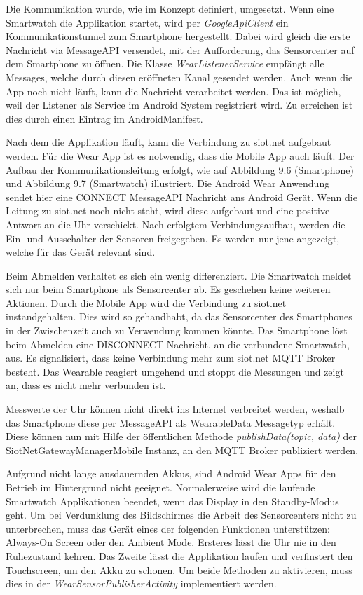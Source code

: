 Die Kommunikation wurde, wie im Konzept definiert, umgesetzt. Wenn eine Smartwatch die Applikation startet, wird per \textit{GoogleApiClient} ein Kommunikationstunnel zum Smartphone hergestellt. Dabei wird gleich die erste Nachricht via Message\gls{API} versendet, mit der Aufforderung, das Sensorcenter auf dem Smartphone zu öffnen. Die Klasse \textit{WearListenerService} empfängt alle Messages, welche durch diesen eröffneten Kanal gesendet werden. Auch wenn die App noch nicht läuft, kann die Nachricht verarbeitet werden. Das ist möglich, weil der Listener als Service im Android System registriert wird. Zu erreichen ist dies durch einen Eintrag im AndroidManifest.

Nach dem die Applikation läuft, kann die Verbindung zu siot.net aufgebaut werden. Für die Wear App ist es notwendig, dass die Mobile App auch läuft. Der Aufbau der Kommunikationsleitung erfolgt, wie auf Abbildung 9.6 (Smartphone) und Abbildung 9.7 (Smartwatch) illustriert. Die Android Wear Anwendung sendet hier eine CONNECT Message\gls{API} Nachricht ans Android Gerät. Wenn die Leitung zu siot.net noch nicht steht, wird diese aufgebaut und eine positive Antwort an die Uhr verschickt. Nach erfolgtem Verbindungsaufbau, werden die Ein- und Ausschalter der Sensoren freigegeben. Es werden nur jene angezeigt, welche für das Gerät relevant sind.

Beim Abmelden verhaltet es sich ein wenig differenziert. Die Smartwatch meldet sich nur beim Smartphone als Sensorcenter ab. Es geschehen keine weiteren Aktionen. Durch die Mobile App wird die Verbindung zu siot.net instandgehalten. Dies wird so gehandhabt, da das Sensorcenter des Smartphones in der Zwischenzeit auch zu Verwendung kommen könnte. Das Smartphone löst beim Abmelden eine DISCONNECT Nachricht, an die verbundene Smartwatch, aus. Es signalisiert, dass keine Verbindung mehr zum siot.net \gls{MQTT} Broker besteht. Das Wearable reagiert umgehend und stoppt die Messungen und zeigt an, dass es nicht mehr verbunden ist.

Messwerte der Uhr können nicht direkt ins Internet verbreitet werden, weshalb das Smartphone diese per Message\gls{API} als WearableData Messagetyp erhält. Diese können nun mit Hilfe der öffentlichen Methode \textit{publishData(topic, data)} der SiotNetGatewayManagerMobile Instanz, an den \gls{MQTT} Broker publiziert werden.

Aufgrund nicht lange ausdauernden Akkus, sind Android Wear Apps für den Betrieb im Hintergrund nicht geeignet. Normalerweise wird die laufende Smartwatch Applikationen beendet, wenn das Display in den Standby-Modus geht. Um bei Verdunklung des Bildschirmes die Arbeit des Sensorcenters nicht zu unterbrechen, muss das Gerät eines der folgenden Funktionen unterstützen: Always-On Screen oder den Ambient Mode. Ersteres lässt die Uhr nie in den Ruhezustand kehren. Das Zweite lässt die Applikation laufen und verfinstert den Touchscreen, um den Akku zu schonen. Um beide Methoden zu aktivieren, muss dies in der \textit{WearSensorPublisherActivity} implementiert werden.
